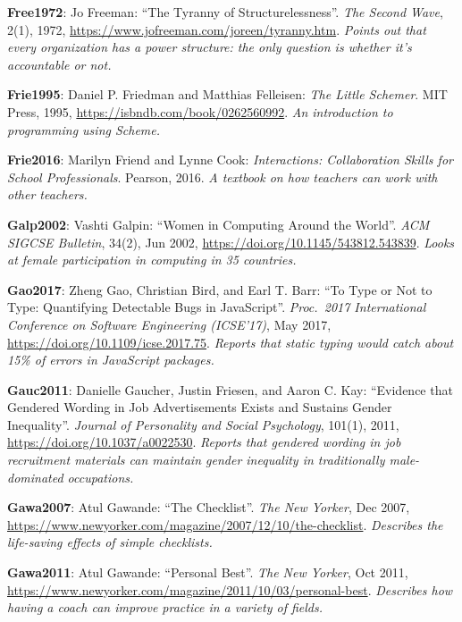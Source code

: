 \textbf{\hypertarget{b:Free1972}{Free1972}\label{b:Free1972}}: Jo Freeman: ``The Tyranny of Structurelessness''. \emph{The Second Wave}, 2(1), 1972, \url{https://www.jofreeman.com/joreen/tyranny.htm}. \emph{Points out that every organization has a power structure: the only question is whether it's accountable or not.}

\textbf{\hypertarget{b:Frie1995}{Frie1995}\label{b:Frie1995}}: Daniel P. Friedman and Matthias Felleisen: \emph{The Little Schemer}. MIT Press, 1995, \url{https://isbndb.com/book/0262560992}. \emph{An introduction to programming using Scheme.}

\textbf{\hypertarget{b:Frie2016}{Frie2016}\label{b:Frie2016}}: Marilyn Friend and Lynne Cook: \emph{Interactions: Collaboration Skills for School Professionals}. Pearson, 2016. \emph{A textbook on how teachers can work with other teachers.}

\textbf{\hypertarget{b:Galp2002}{Galp2002}\label{b:Galp2002}}: Vashti Galpin: ``Women in Computing Around the World''. \emph{ACM SIGCSE Bulletin}, 34(2), Jun 2002, \url{https://doi.org/10.1145/543812.543839}. \emph{Looks at female participation in computing in 35 countries.}

\textbf{\hypertarget{b:Gao2017}{Gao2017}\label{b:Gao2017}}: Zheng Gao, Christian Bird, and Earl T. Barr: ``To Type or Not to Type: Quantifying Detectable Bugs in JavaScript''. \emph{Proc.\ 2017 International Conference on Software Engineering (ICSE'17)}, May 2017, \url{https://doi.org/10.1109/icse.2017.75}. \emph{Reports that static typing would catch about 15\% of errors in JavaScript packages.}

\textbf{\hypertarget{b:Gauc2011}{Gauc2011}\label{b:Gauc2011}}: Danielle Gaucher, Justin Friesen, and Aaron C. Kay: ``Evidence that Gendered Wording in Job Advertisements Exists and Sustains Gender Inequality''. \emph{Journal of Personality and Social Psychology}, 101(1), 2011, \url{https://doi.org/10.1037/a0022530}. \emph{Reports that gendered wording in job recruitment materials can maintain gender inequality in traditionally male-dominated occupations.}

\textbf{\hypertarget{b:Gawa2007}{Gawa2007}\label{b:Gawa2007}}: Atul Gawande: ``The Checklist''. \emph{The New Yorker}, Dec 2007, \url{https://www.newyorker.com/magazine/2007/12/10/the-checklist}. \emph{Describes the life-saving effects of simple checklists.}

\textbf{\hypertarget{b:Gawa2011}{Gawa2011}\label{b:Gawa2011}}: Atul Gawande: ``Personal Best''. \emph{The New Yorker}, Oct 2011, \url{https://www.newyorker.com/magazine/2011/10/03/personal-best}. \emph{Describes how having a coach can improve practice in a variety of fields.}

